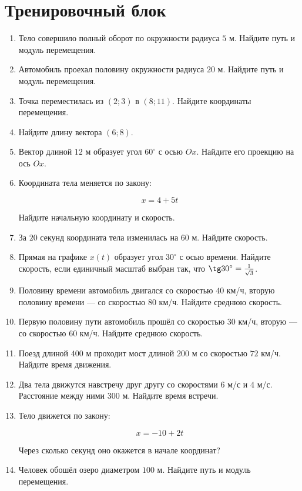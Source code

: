 \documentclass[a4paper,12pt]{article}
\begin{document}
\clearpage

\section*{Тренировочный блок}

\begin{enumerate}[itemsep=8pt]

\item Тело совершило полный оборот по окружности радиуса $5$ м.
Найдите путь и модуль перемещения.

\item Автомобиль проехал половину окружности радиуса $20$ м.
Найдите путь и модуль перемещения.

\item Точка переместилась из $(2;3)$ в $(8;11)$.
Найдите координаты перемещения.

\item Найдите длину вектора $(6;8)$.

\item Вектор длиной $12$ м образует угол $60^\circ$ с осью $Ox$.
Найдите его проекцию на ось $Ox$.

\item Координата тела меняется по закону:

\[
x=4+5t
\]

Найдите начальную координату и скорость.

\item За $20$ секунд координата тела изменилась на $60$ м.
Найдите скорость.

\item Прямая на графике $x(t)$ образует угол $30^\circ$ с осью времени.
Найдите скорость, если единичный масштаб выбран так, что
$\tg30^\circ=\frac1{\sqrt3}$.

\item Половину времени автомобиль двигался со скоростью
$40$ км/ч, вторую половину времени --- со скоростью
$80$ км/ч.
Найдите среднюю скорость.

\item Первую половину пути автомобиль прошёл со скоростью
$30$ км/ч, вторую --- со скоростью $60$ км/ч.
Найдите среднюю скорость.

\item Поезд длиной $400$ м проходит мост длиной $200$ м
со скоростью $72$ км/ч.
Найдите время движения.

\item Два тела движутся навстречу друг другу со скоростями
$6$ м/с и $4$ м/с.
Расстояние между ними $300$ м.
Найдите время встречи.

\item Тело движется по закону:

\[
x=-10+2t
\]

Через сколько секунд оно окажется в начале координат?

\item Человек обошёл озеро диаметром $100$ м.
Найдите путь и модуль перемещения.

\end{enumerate}
\end{document}
